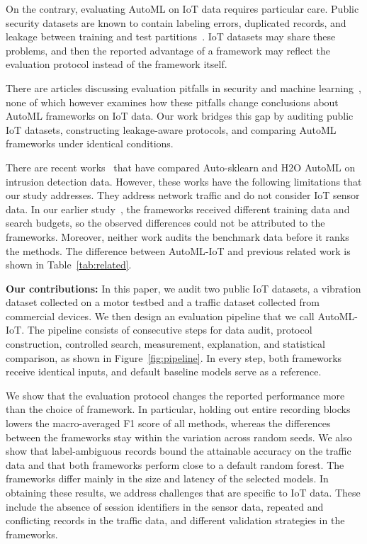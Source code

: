 On the contrary, evaluating AutoML on IoT data requires particular care. Public security datasets are known to contain labeling errors, duplicated records, and leakage between training and test partitions~\cite{engelen2021,lanvin2023,kapoor2023}. IoT datasets may share these problems, and then the reported advantage of a framework may reflect the evaluation protocol instead of the framework itself.

There are articles discussing evaluation pitfalls in security and machine learning~\cite{arp2022,kapoor2023}, none of which however examines how these pitfalls change conclusions about AutoML frameworks on IoT data. Our work bridges this gap by auditing public IoT datasets, constructing leakage-aware protocols, and comparing AutoML frameworks under identical conditions.

There are recent works~\cite{guntur2025autoai,velnambi2026} that have compared Auto-sklearn and H2O AutoML on intrusion detection data. However, these works have the following limitations that our study addresses. They address network traffic and do not consider IoT sensor data. In our earlier study~\cite{velnambi2026}, the frameworks received different training data and search budgets, so the observed differences could not be attributed to the frameworks. Moreover, neither work audits the benchmark data before it ranks the methods. The difference between AutoML-IoT and previous related work is shown in Table~\ref{tab:related}.


\textbf{Our contributions:} In this paper, we audit two public IoT datasets, a vibration dataset collected on a motor testbed and a traffic dataset collected from commercial devices. We then design an evaluation pipeline that we call AutoML-IoT. The pipeline consists of consecutive steps for data audit, protocol construction, controlled search, measurement, explanation, and statistical comparison, as shown in Figure~\ref{fig:pipeline}. In every step, both frameworks receive identical inputs, and default baseline models serve as a reference.


We show that the evaluation protocol changes the reported performance more than the choice of framework. In particular, holding out entire recording blocks lowers the macro-averaged F1 score of all methods, whereas the differences between the frameworks stay within the variation across random seeds. We also show that label-ambiguous records bound the attainable accuracy on the traffic data and that both frameworks perform close to a default random forest. The frameworks differ mainly in the size and latency of the selected models. In obtaining these results, we address challenges that are specific to IoT data. These include the absence of session identifiers in the sensor data, repeated and conflicting records in the traffic data, and different validation strategies in the frameworks.

